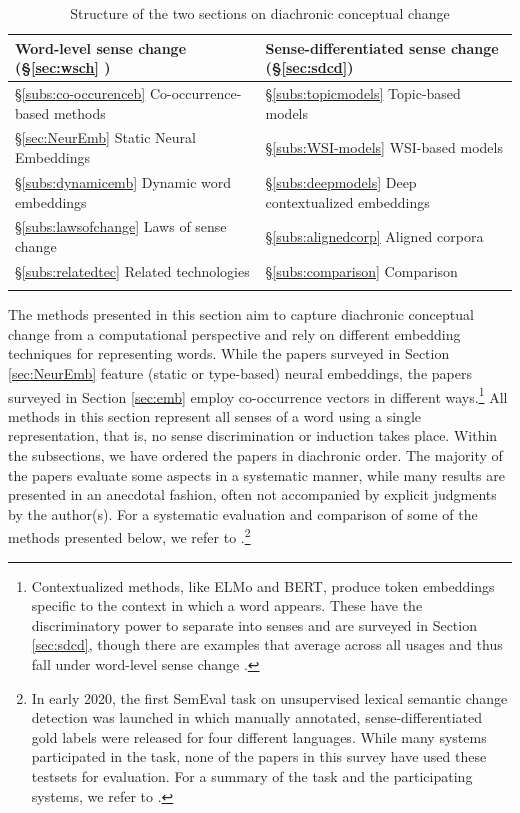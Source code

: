 \documentclass[output=paper]{langsci/langscibook}
\begin{document}
  \begin{table}
\caption{Structure of the two sections on diachronic conceptual change}
\begin{tabular}{ll}
\lsptoprule
Word-level sense change (§\ref{sec:wsch} ) & Sense-differentiated sense change (§\ref{sec:sdcd})\\
\midrule
§\ref{subs:co-occurenceb} Co-occurrence-based methods &  §\ref{subs:topicmodels} Topic-based models\\
§\ref{sec:NeurEmb} Static Neural Embeddings & §\ref{subs:WSI-models}  WSI-based models\\
§\ref{subs:dynamicemb} Dynamic word embeddings & §\ref{subs:deepmodels}  Deep contextualized embeddings\\
§\ref{subs:lawsofchange}  Laws of sense change & §\ref{subs:alignedcorp}  Aligned corpora\\
§\ref{subs:relatedtec}  Related technologies & §\ref{subs:comparison}  Comparison\\
\lspbottomrule
\end{tabular}
\end{table} 
    
    The methods presented in this section aim to capture  diachronic conceptual change from a computational perspective and rely on different embedding techniques for representing words. While the papers surveyed in Section \ref{sec:NeurEmb}  feature (static or type-based) neural embeddings, the papers surveyed in Section \ref{sec:emb} employ co-occurrence vectors in different ways.\footnote{Contextualized methods, like ELMo and BERT,  produce token embeddings specific to the context in which a word appears. These have the discriminatory power to separate into senses and are surveyed in Section \ref{sec:sdcd}, though there are examples that average across all usages and thus fall under word-level sense change \citep{martinc-etal-2020-leveraging}.  }
    All methods in this section represent all senses of a word using a single representation, that is, no sense discrimination or induction takes place. Within the subsections, we have ordered the papers in diachronic order.  The majority of the papers evaluate some aspects in a systematic manner, while many results are presented in an anecdotal fashion, often not accompanied by explicit judgments by the author(s). For a systematic evaluation and comparison of some of the methods presented below, we refer to \citet{schlechtweg-etal-2019-wind}.\footnote{In early 2020, the first SemEval task on unsupervised lexical semantic change detection was launched in which manually annotated, sense-differentiated gold labels were released for four different languages. While many systems participated in the task, none of the papers in this survey have used these testsets for evaluation. For a summary of the task and the participating systems, we refer to \citet{schlechtweg-etal-2020-semeval}.} 
   
\end{document}
